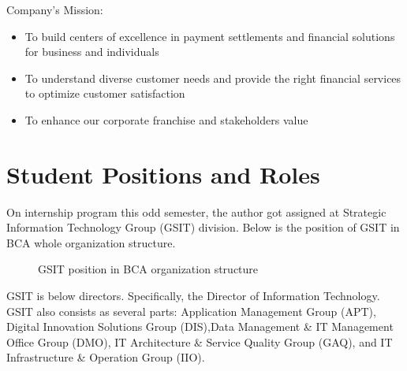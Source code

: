 Company's Mission:
\begin{itemize}
	\itemsep0em
    \item To build centers of excellence in payment settlements and financial solutions for business and individuals
    \item To understand diverse customer needs and provide the right financial services to optimize customer satisfaction
    \item To enhance our corporate franchise and stakeholders value
\end{itemize}

\section{Student Positions and Roles}
On internship program this odd semester, the author got assigned at Strategic Information Technology Group (GSIT) division. Below is the position of GSIT in BCA whole organization structure.\\

\begin{figure}[H]
\centering
{}
\caption{GSIT position in BCA organization structure}
\end{figure}

GSIT is below directors. Specifically, the Director of  Information Technology. GSIT also consists as several parts: Application Management Group (APT), Digital Innovation Solutions Group (DIS),Data Management \& IT Management Office Group (DMO), IT Architecture \& Service Quality Group (GAQ), and IT Infrastructure \& Operation Group (IIO).\\

